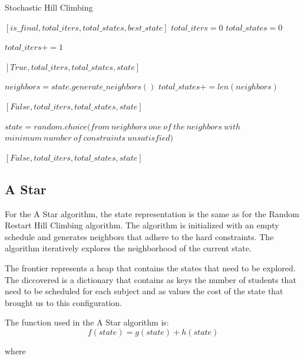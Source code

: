 \documentclass[runningheads]{paper}
\begin{document}
\addtocounter{algorithm}{-1}
\begin{algorithm}
\caption{Stochastic Hill Climbing}
\begin{algorithmic}[1]
 \Return $[is\_final, total\_iters, total\_states, best\_state] $ 
\State $total\_iters = 0$
\State $total\_states = 0$

\State $total\_iters += 1$

\Return $[True, total\_iters, total\_states, state]$
\EndIf

\State $neighbors = state.generate\_neighbors()$
\State $total\_states += len(neighbors)$

\Return $[False, total\_iters, total\_states, state]$
\EndIf

\State $state = random.choice(from\ neighbors\ one\ of\ the\ neighbors\ with$ \\
\hspace*{2em}$minimum\ number\ of\ constraints\ unsatisfied)$
\EndWhile

\State \Return $[False, total\_iters, total\_states, state]$

\EndProcedure
\end{algorithmic}
\end{algorithm}



\subsection{A Star}
For the A Star algorithm, the state representation is the same as for the Random
Restart Hill Climbing algorithm. The algorithm is initialized with an empty
schedule and generates neighbors that adhere to the hard constraints. The 
algorithm iteratively explores the neighborhood of the current state.

The frontier represents a heap that contains the states that need to be explored.
The diccovered is a dictionary that contains as keys the number of students that
need to be scheduled for each subject and as values the cost of the state that
brought us to this configuration.

The function used in the A Star algorithm is:
\begin{equation}
    f(state) = g(state) + h(state)
\end{equation}

where
\end{document}
